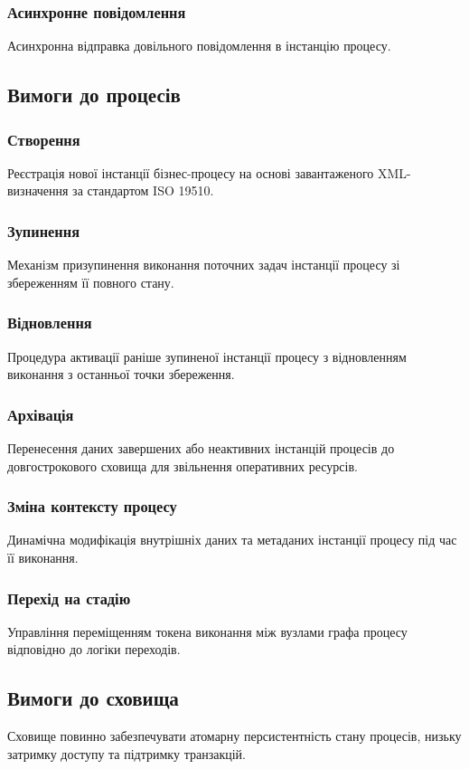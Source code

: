 \documentclass{article}
\begin{document}
\subsubsection{Асинхронне повідомлення}
Асинхронна відправка довільного повідомлення в інстанцію процесу.

\subsection{Вимоги до процесів}

\subsubsection{Створення}
Реєстрація нової інстанції бізнес-процесу на основі завантаженого XML-визначення за стандартом ISO 19510.

\subsubsection{Зупинення}
Механізм призупинення виконання поточних задач інстанції процесу зі збереженням її повного стану.

\subsubsection{Відновлення}
Процедура активації раніше зупиненої інстанції процесу з відновленням виконання з останньої точки збереження.

\subsubsection{Архівація}
Перенесення даних завершених або неактивних інстанцій процесів до довгострокового сховища для звільнення оперативних ресурсів.

\subsubsection{Зміна контексту процесу}
Динамічна модифікація внутрішніх даних та метаданих інстанції процесу під час її виконання.

\subsubsection{Перехід на стадію}
Управління переміщенням токена виконання між вузлами графа процесу відповідно до логіки переходів.

\subsection{Вимоги до сховища}
Сховище повинно забезпечувати атомарну персистентність стану процесів, низьку затримку доступу та підтримку транзакцій.
\end{document}

